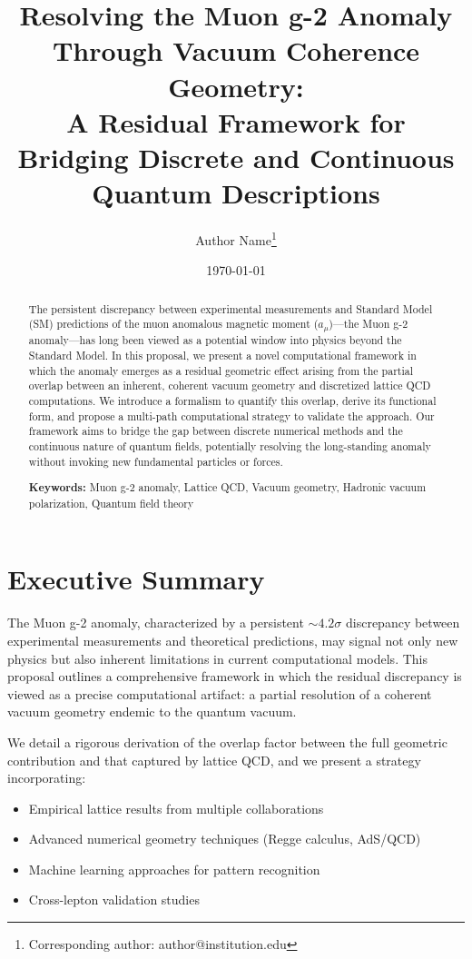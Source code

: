 ﻿\documentclass[12pt]{article}
\title{\vspace{-2em}\textbf{Resolving the Muon g-2 Anomaly Through Vacuum Coherence Geometry:} \\ 
\vspace{0.5em}
\Large A Residual Framework for Bridging Discrete and Continuous Quantum Descriptions}
\author[1]{Author Name\thanks{Corresponding author: author@institution.edu}}
\affil[1]{Department of Physics, Institution Name\\
Address, City, State/Country ZIP}
\date{\today}
\theoremstyle{definition}
\theoremstyle{plain}
\begin{document}
\maketitle


\begin{abstract}
\noindent The persistent discrepancy between experimental measurements and Standard Model (SM) predictions of the muon anomalous magnetic moment ($a_\mu$)---the Muon g-2 anomaly---has long been viewed as a potential window into physics beyond the Standard Model. In this proposal, we present a novel computational framework in which the anomaly emerges as a residual geometric effect arising from the partial overlap between an inherent, coherent vacuum geometry and discretized lattice QCD computations. We introduce a formalism to quantify this overlap, derive its functional form, and propose a multi-path computational strategy to validate the approach. Our framework aims to bridge the gap between discrete numerical methods and the continuous nature of quantum fields, potentially resolving the long-standing anomaly without invoking new fundamental particles or forces.


\vspace{0.5em}
\noindent\textbf{Keywords:} Muon g-2 anomaly, Lattice QCD, Vacuum geometry, Hadronic vacuum polarization, Quantum field theory
\end{abstract}


\section{Executive Summary}


The Muon g-2 anomaly, characterized by a persistent $\sim 4.2\sigma$ discrepancy between experimental measurements and theoretical predictions, may signal not only new physics but also inherent limitations in current computational models. This proposal outlines a comprehensive framework in which the residual discrepancy is viewed as a precise computational artifact: a partial resolution of a coherent vacuum geometry endemic to the quantum vacuum. 


We detail a rigorous derivation of the overlap factor between the full geometric contribution and that captured by lattice QCD, and we present a strategy incorporating:
\begin{itemize}
    \item Empirical lattice results from multiple collaborations
    \item Advanced numerical geometry techniques (Regge calculus, AdS/QCD)
    \item Machine learning approaches for pattern recognition
    \item Cross-lepton validation studies
\end{itemize}
\end{document}
